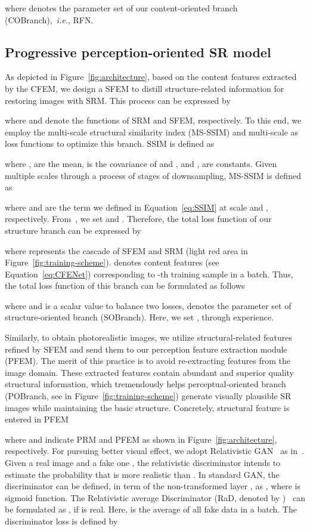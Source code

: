 \documentclass[preprint]{elsarticle}
\newcommand{\ie}{\textit{i.e.}}
\begin{document}
where  denotes the parameter set of our content-oriented branch (COBranch),~\ie, RFN.
\subsection{Progressive perception-oriented SR model}\label{branch}
As depicted in Figure~\ref{fig:architecture}, based on the content features extracted by the CFEM, we design a SFEM to distill structure-related information for restoring images with SRM. This process can be expressed by


where  and  denote the functions of SRM and SFEM, respectively. To this end, we employ the multi-scale structural similarity index (MS-SSIM) and multi-scale  as loss functions to optimize this branch. SSIM is defined as


where ,  are the mean,  is the covariance of  and , and ,  are constants. Given multiple scales through a process of  stages of downsampling, MS-SSIM is defined as

where  and  are the term we defined in Equation~\ref{eq:SSIM} at scale  and , respectively. From~\cite{MS-SSIM}, we set  and . Therefore, the total loss function of our structure branch can be expressed by


where  represents the cascade of SFEM and SRM (light red area in Figure~\ref{fig:training-scheme}).  denotes content features (see Equation~\ref{eq:CFENet}) corresponding to -th training sample in a batch. Thus, the total loss function of this branch can be formulated as follows


where  and  is a scalar value to balance two losses,  denotes the parameter set of structure-oriented branch (SOBranch). Here, we set ,  through experience.

Similarly, to obtain photorealistic images, we utilize structural-related features refined by SFEM and send them to our perception feature extraction module (PFEM). The merit of this practice is to avoid re-extracting features from the image domain. These extracted features contain abundant and superior quality structural information, which tremendously helps perceptual-oriented branch (POBranch, see in Figure~\ref{fig:training-scheme}) generate visually plausible SR images while maintaining the basic structure. Concretely, structural feature  is entered in PFEM


where  and  indicate PRM and PFEM as shown in Figure~\ref{fig:architecture}, respectively. For pursuing better visual effect, we adopt Relativistic GAN~\cite{RaSGAN} as in~\cite{ESRGAN}. Given a real image  and a fake one , the relativistic discriminator intends to estimate the probability that  is more realistic than . In standard GAN, the discriminator can be defined, in term of the non-transformed layer , as , where  is sigmoid function. The Relativistic average Discriminator (RaD, denoted by )~\cite{RaSGAN} can be formulated as , if  is real. Here,  is the average of all fake data in a batch. The discriminator loss is defined by
\end{document}
